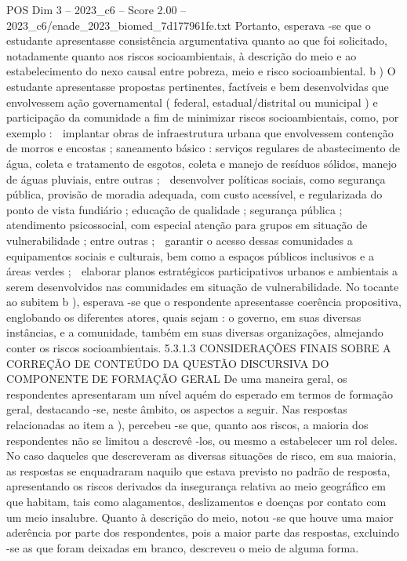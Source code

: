 \begin{textsample}{POS Dim 3 – 2023\_c6 – Score 2.00 – 2023\_c6/enade\_2023\_biomed\_7d177961fe.txt}
Portanto, esperava -se que o estudante apresentasse consistência argumentativa quanto ao que foi solicitado, notadamente quanto aos riscos socioambientais, à descrição do meio e ao estabelecimento do nexo causal entre pobreza, meio e risco socioambiental. b ) O estudante apresentasse propostas pertinentes, factíveis e bem desenvolvidas que envolvessem ação governamental ( federal, estadual/distrital ou municipal ) e participação da comunidade a fim de minimizar riscos socioambientais, como, por exemplo :  implantar obras de infraestrutura urbana que envolvessem contenção de morros e encostas ; saneamento básico : serviços regulares de abastecimento de água, coleta e tratamento de esgotos, coleta e manejo de resíduos sólidos, manejo de águas pluviais, entre outras ;  desenvolver políticas sociais, como segurança pública, provisão de moradia adequada, com custo acessível, e regularizada do ponto de vista fundiário ; educação de qualidade ; segurança pública ; atendimento psicossocial, com especial atenção para grupos em situação de vulnerabilidade ; entre outras ;  garantir o acesso dessas comunidades a equipamentos sociais e culturais, bem como a espaços públicos inclusivos e a áreas verdes ;  elaborar planos estratégicos participativos urbanos e ambientais a serem desenvolvidos nas comunidades em situação de vulnerabilidade.
No tocante ao subitem b ), esperava -se que o respondente apresentasse coerência propositiva, englobando os diferentes atores, quais sejam : o governo, em suas diversas instâncias, e a comunidade, também em suas diversas organizações, almejando conter os riscos socioambientais. 5.3.1.3 CONSIDERAÇÕES FINAIS SOBRE A CORREÇÃO DE CONTEÚDO DA QUESTÃO DISCURSIVA DO COMPONENTE DE FORMAÇÃO GERAL De uma maneira geral, os respondentes apresentaram um nível aquém do esperado em termos de formação geral, destacando -se, neste âmbito, os aspectos a seguir.
Nas respostas relacionadas ao item a ), percebeu -se que, quanto aos riscos, a maioria dos respondentes não se limitou a descrevê -los, ou mesmo a estabelecer um rol deles.
No caso daqueles que descreveram as diversas situações de risco, em sua maioria, as respostas se enquadraram naquilo que estava previsto no padrão de resposta, apresentando os riscos derivados da insegurança relativa ao meio geográfico em que habitam, tais como alagamentos, deslizamentos e doenças por contato com um meio insalubre.
Quanto à descrição do meio, notou -se que houve uma maior aderência por parte dos respondentes, pois a maior parte das respostas, excluindo -se as que foram deixadas em branco, descreveu o meio de alguma forma.

\end{textsample}
